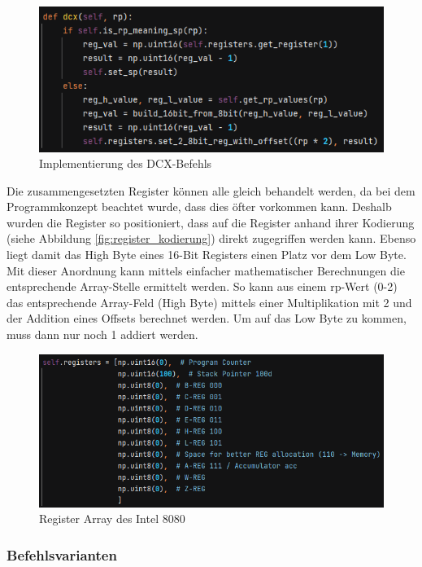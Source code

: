 \documentclass[12pt]{article}
\newcommand{\imgSpaceBefore}{\vspace{10pt}}
\begin{document}
\imgSpaceBefore
\begin{figure}[H]
\centering
\includegraphics[width=15cm]{Bilder/dcx_impl}
\caption{Implementierung des DCX-Befehls}
\label{fig:dcx_impl}
\end{figure}

\noindent
Die zusammengesetzten Register können alle gleich behandelt werden, da bei dem Programmkonzept beachtet wurde, dass dies öfter vorkommen kann. Deshalb wurden die Register so positioniert, dass auf die Register anhand ihrer Kodierung (siehe Abbildung \ref{fig:register_kodierung}) direkt zugegriffen werden kann. Ebenso liegt damit das High Byte eines 16-Bit Registers einen Platz vor dem Low Byte. Mit dieser Anordnung kann mittels einfacher mathematischer Berechnungen die entsprechende Array-Stelle ermittelt werden. So kann aus einem rp-Wert (0-2) das entsprechende Array-Feld (High Byte) mittels einer Multiplikation mit 2 und der Addition eines Offsets berechnet werden. Um auf das Low Byte zu kommen, muss dann nur noch 1 addiert werden.

\imgSpaceBefore
\begin{figure}[H]
\centering
\includegraphics[width=15cm]{Bilder/register_array}
\caption{Register Array des Intel 8080}
\label{fig:reg_array}
\end{figure}

\newpage


\subsubsection{Befehlsvarianten}
\end{document}
